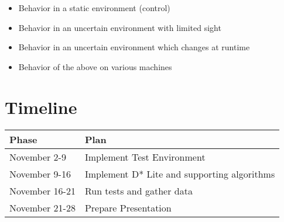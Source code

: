 \documentclass[11pt]{article}
\begin{document}
\begin{itemize}
    \item Behavior in a static environment (control)
    \item Behavior in an uncertain environment with limited sight
    \item Behavior in an uncertain environment which changes at runtime
    \item Behavior of the above on various machines
\end{itemize}

\section{Timeline}

\begin{centering}
\begin{table}[H]
\begin{tabular}{ | l | l |}
\hline
Phase & Plan \\ \hline
November 2-9 & Implement Test Environment \\ \hline
November 9-16 & Implement D* Lite and supporting algorithms \\ \hline
November 16-21 & Run tests and gather data \\ \hline
November 21-28 & Prepare Presentation \\ \hline
\end{tabular}
\end{table}
\end{centering}
\end{document}
